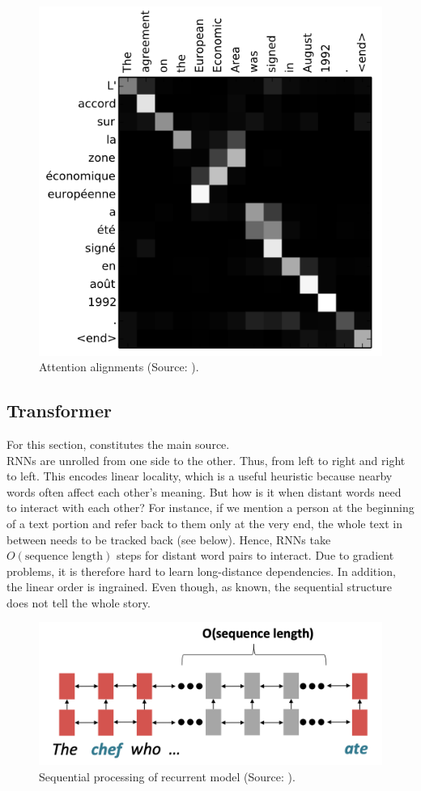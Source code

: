 \documentclass[
]{krantz}
\begin{document}
\begin{figure}

{\centering \includegraphics[width=0.5\linewidth]{./figures/01-01-nlp/attention_focus_bahdanau} 

}

\caption{Attention alignments (Source: \citet{Bahdanau2014}).}\label{fig:attentionfocus}
\end{figure}



\hypertarget{transformer}{%
\subsection{Transformer}\label{transformer}}

For this section, \citet{Manning2022} constitutes the main source.\\

RNNs are unrolled from one side to the other. Thus, from left to right
and right to left. This encodes linear locality, which is a useful
heuristic because nearby words often affect each other's meaning. But
how is it when distant words need to interact with each other? For
instance, if we mention a person at the beginning of a text portion
and refer back to them only at the very end, the whole text in between
needs to be tracked back (see below). Hence, RNNs take \(O(\text{sequence
length})\) steps for distant word pairs to interact. Due to gradient
problems, it is therefore hard to learn long-distance dependencies. In
addition, the linear order is ingrained. Even though, as known, the
sequential structure does not tell the whole story.

\begin{figure}

{\centering \includegraphics[width=0.7\linewidth]{./figures/01-01-nlp/transformer_rnnlim_stanford} 

}

\caption{Sequential processing of recurrent model (Source: \citet{Manning2022}).}\label{fig:tfrnnlimstanford}
\end{figure}
\end{document}
